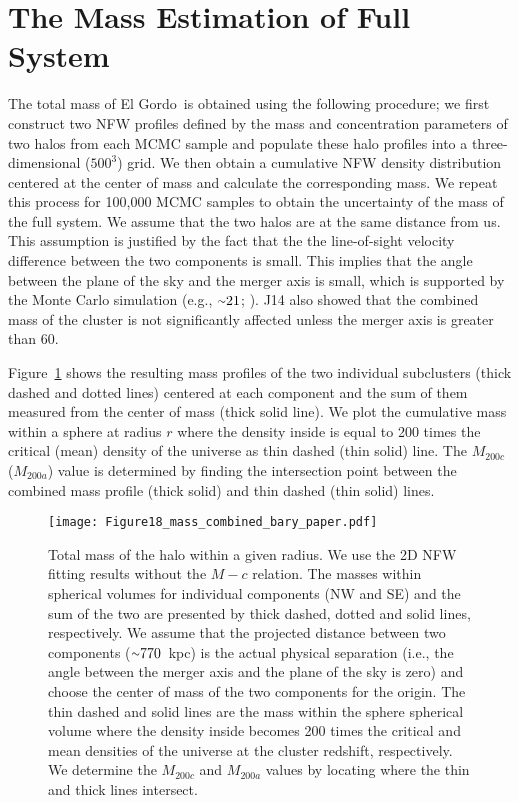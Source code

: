 \documentclass[twocolumn]{aastex631}
\newcommand{\elgordo}{El Gordo}
\newcommand{\mytilde}{\raise.19ex\hbox{$\scriptstyle\sim$}}
\begin{document}
\section{The Mass Estimation of Full System} \label{mass_total}
The total mass of \elgordo~is obtained using the following procedure; 
we first construct two NFW profiles defined by the mass and concentration parameters of two halos from each MCMC sample and populate these halo profiles into a three-dimensional ($500^3$) grid. 
We then obtain a cumulative NFW density distribution centered at the center of mass and calculate the corresponding mass. 
We repeat this process for 100,000 MCMC samples to obtain the uncertainty of the mass of the full system. 
We assume that the two halos are at the same distance from us. This assumption is justified by the fact that the the line-of-sight velocity difference between the two components is small. 
This implies that the angle between the plane of the sky and the merger axis is small, which is supported by the Monte Carlo simulation (e.g., $\mytilde21$\degr; \citealt{Ng2015}). 
J14 also showed that the combined mass of the cluster is not significantly affected unless the merger axis is greater than 60\degr. 


Figure~\ref{fig:combined_mass_profile} shows the resulting mass profiles of the two individual subclusters (thick dashed and dotted lines) centered at each component and the sum of them measured from the center of mass (thick solid line). 
We plot the cumulative mass within a sphere at radius $r$ where the density inside is equal to 200 times the critical (mean) density of the universe as thin dashed (thin solid) line. 
The $M_{200c}$ ($M_{200a}$) value is determined by finding the intersection point between the combined mass profile (thick solid) and thin dashed (thin solid) lines. 






\begin{figure}
\centering
\texttt{[image: Figure18\_mass\_combined\_bary\_paper.pdf]}
\caption{Total mass of the halo within a given radius. 
We use the 2D NFW fitting results without the $M-c$ relation. 
The masses within spherical volumes for individual components (NW and SE) and the sum of the two are presented by thick dashed, dotted and solid lines, respectively. 
We assume that the projected distance between two components ($\mytilde770$~kpc) is the actual physical separation (i.e., the angle between the merger axis and the plane of the sky is zero) and choose the center of mass of the two components for the origin. 
The thin dashed and solid lines are the mass within the sphere spherical volume where the density inside becomes 200 times the critical and mean densities of the universe at the cluster redshift, respectively. 
We determine the $M_{200c}$ and $M_{200a}$ values by locating where the thin and thick lines intersect. }
\label{fig:combined_mass_profile}
\end{figure}




\clearpage
\end{document}
